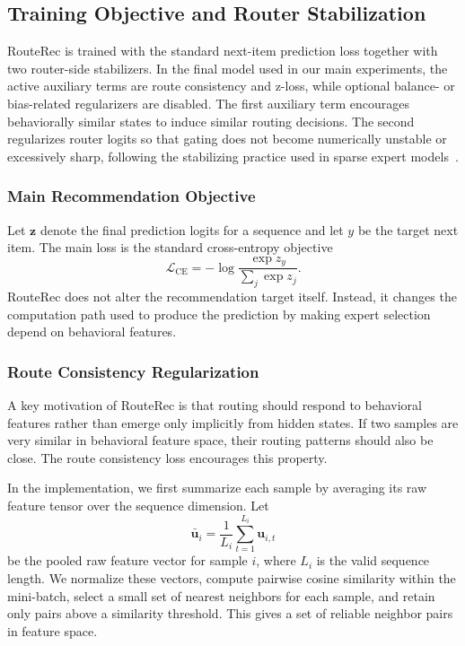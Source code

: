 \documentclass[sigconf,anonymous,review]{acmart}
\begin{document}
\subsection{Training Objective and Router Stabilization}
\label{sec:training-objective}

RouteRec is trained with the standard next-item prediction loss together with two router-side stabilizers. In the final model used in our main experiments, the active auxiliary terms are route consistency and z-loss, while optional balance- or bias-related regularizers are disabled. The first auxiliary term encourages behaviorally similar states to induce similar routing decisions. The second regularizes router logits so that gating does not become numerically unstable or excessively sharp, following the stabilizing practice used in sparse expert models~\cite{zoph2022stmoe}.

\subsubsection{Main Recommendation Objective}

Let $\mathbf{z}$ denote the final prediction logits for a sequence and let $y$ be the target next item. The main loss is the standard cross-entropy objective
\[
\mathcal{L}_{\mathrm{CE}}
=
-\log \frac{\exp z_y}{\sum_{j}\exp z_j}.
\]
RouteRec does not alter the recommendation target itself. Instead, it changes the computation path used to produce the prediction by making expert selection depend on behavioral features.

\subsubsection{Route Consistency Regularization}

A key motivation of RouteRec is that routing should respond to behavioral features rather than emerge only implicitly from hidden states. If two samples are very similar in behavioral feature space, their routing patterns should also be close. The route consistency loss encourages this property.

In the implementation, we first summarize each sample by averaging its raw feature tensor over the sequence dimension. Let
\[
\bar{\mathbf{u}}_i
=
\frac{1}{L_i}\sum_{t=1}^{L_i}\mathbf{u}_{i,t}
\]
be the pooled raw feature vector for sample $i$, where $L_i$ is the valid sequence length. We normalize these vectors, compute pairwise cosine similarity within the mini-batch, select a small set of nearest neighbors for each sample, and retain only pairs above a similarity threshold. This gives a set of reliable neighbor pairs in feature space.
\end{document}

